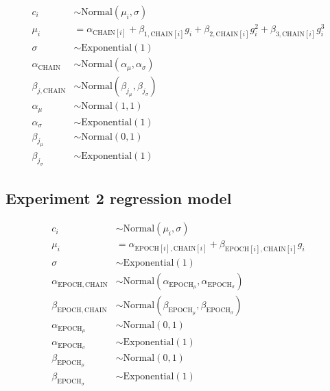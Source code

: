 \documentclass[doc,biblatex]{apa7}
\begin{document}
	\begin{equation}
	\begin{aligned}
	   c_i                   & \sim \mathrm{Normal}(\mu_i, \sigma) \\
	 \mu_i                   & = \alpha_{\mathrm{CHAIN}[i]} + \beta_{1,\mathrm{CHAIN}[i]} g_i + \beta_{2,\mathrm{CHAIN}[i]} g_i^2 + \beta_{3,\mathrm{CHAIN}[i]} g_i^3 \\
	\sigma                   & \sim \mathrm{Exponential}(1) \\
	\alpha_{\mathrm{CHAIN}}  & \sim \mathrm{Normal}(\alpha_\mu, \alpha_\sigma) \\
	\beta_{j,\mathrm{CHAIN}} & \sim \mathrm{Normal}(\beta_{j_\mu}, \beta_{j_\sigma}) \\
	\alpha_\mu               & \sim \mathrm{Normal}(1, 1) \\
	\alpha_\sigma            & \sim \mathrm{Exponential}(1) \\
	\beta_{j_\mu}            & \sim \mathrm{Normal}(0, 1) \\
	\beta_{j_\sigma}         & \sim \mathrm{Exponential}(1)
	\end{aligned}
	\end{equation}

\subsection{Experiment 2 regression model}

	\begin{equation}
	\begin{aligned}
	   c_i                                 & \sim \mathrm{Normal}(\mu_i, \sigma) \\
	 \mu_i                                 & = \alpha_{\mathrm{EPOCH}[i],\mathrm{CHAIN}[i]} + \beta_{\mathrm{EPOCH}[i],\mathrm{CHAIN}[i]} g_i \\
	\sigma                                 & \sim \mathrm{Exponential}(1) \\
	\alpha_{\mathrm{EPOCH},\mathrm{CHAIN}} & \sim \mathrm{Normal}(\alpha_{\mathrm{EPOCH}_\mu}, \alpha_{\mathrm{EPOCH}_\sigma}) \\
	\beta_{\mathrm{EPOCH},\mathrm{CHAIN}}  & \sim \mathrm{Normal}(\beta_{\mathrm{EPOCH}_\mu}, \beta_{\mathrm{EPOCH}_\sigma}) \\
	\alpha_{\mathrm{EPOCH}_\mu}            & \sim \mathrm{Normal}(0, 1) \\
	\alpha_{\mathrm{EPOCH}_\sigma}         & \sim \mathrm{Exponential}(1) \\
	\beta_{\mathrm{EPOCH}_\mu}             & \sim \mathrm{Normal}(0, 1) \\
	\beta_{\mathrm{EPOCH}_\sigma}          & \sim \mathrm{Exponential}(1)
	\end{aligned}
	\end{equation}
\end{document}

